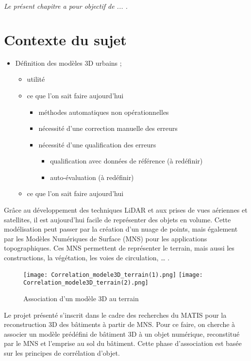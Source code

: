 
\textit{Le présent chapitre a pour objectif de ... . }

\section{Contexte du sujet}

\begin{itemize}
	\item Définition des modèles 3D urbains ;
	\begin{itemize}
		\item utilité
		\item ce que l'on sait faire aujourd'hui
		\begin{itemize}
			\item méthodes automatiques non opérationnelles
			\item nécessité d'une correction manuelle des erreurs
			\item nécessité d'une qualification des erreurs
			\begin{itemize}
				\item qualification avec données de référence (à redéfinir)
				\item auto-évaluation (à redéfinir)
			\end{itemize}
		\end{itemize}
		\item ce que l'on sait faire aujourd'hui
	\end{itemize}
\end{itemize}



\newpage
Grâce au développement des techniques LiDAR et aux prises de vues aériennes et satellites, il est aujourd’hui facile de représenter des objets en volume. Cette modélisation peut passer par la création d’un nuage de points, mais également par les Modèles Numériques de Surface (MNS) pour les applications topographiques. Ces MNS permettent de représenter le terrain, mais aussi les constructions, la végétation, les voies de circulation, … .\newline

\begin{wrapfigure}[18]{r}{7cm}
	\texttt{[image: Correlation\_modele3D\_terrain(1).png]}
	\texttt{[image: Correlation\_modele3D\_terrain(2).png]}
	\caption{Association d'un modèle 3D au terrain}
	\label{Association d'un modèle 3D au terrain}
\end{wrapfigure}
Le projet présenté s’inscrit dans le cadre des recherches du MATIS pour la reconstruction 3D des bâtiments à partir de MNS. Pour ce faire, on cherche à associer un modèle prédéfini de bâtiment 3D à un objet numérique, reconstitué par le MNS et l’emprise au sol du bâtiment. Cette phase d’association est basée sur les principes de corrélation d’objet. \newline

